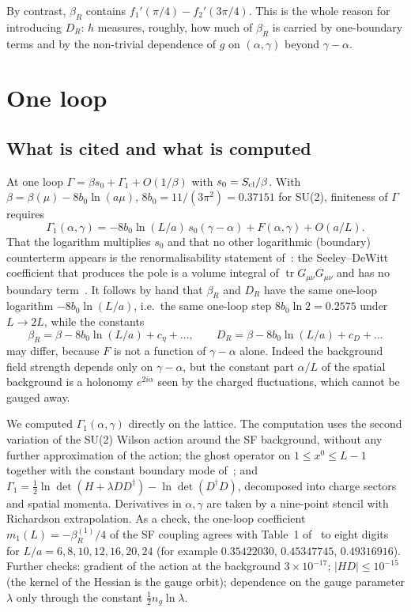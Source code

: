 \documentclass[11pt,a4paper]{article}
\theoremstyle{definition}
\theoremstyle{remark}
\newcommand{\bR}{\beta_R}
\newcommand{\DR}{D_R}
\begin{document}
By contrast, $\bR$ contains $f_1'(\pi/4)-f_2'(3\pi/4)$. This is the whole reason for introducing $\DR$: $h$ measures, roughly, how much of $\bR$ is carried by one-boundary terms and by the non-trivial dependence of $g$ on $(\alpha,\gamma)$ beyond $\gamma-\alpha$.

\section{One loop}\label{sec:oneloop}

\subsection{What is cited and what is computed}

At one loop $\Gamma=\beta s_0+\Gamma_1+O(1/\beta)$ with $s_0=S_{\rm cl}/\beta$. With $\beta=\beta(\mu)-8b_0\ln(a\mu)$, $8b_0=11/(3\pi^2)=0.37151$ for SU(2), finiteness of $\Gamma$ requires
\[
\Gamma_1(\alpha,\gamma)=-8b_0\ln(L/a)\,s_0(\gamma-\alpha)+F(\alpha,\gamma)+O(a/L).
\]
That the logarithm multiplies $s_0$ and that no other logarithmic (boundary) counterterm appears is the renormalisability statement of~\cite{LNWW}: the Seeley--DeWitt coefficient that produces the pole is a volume integral of $\operatorname{tr}G_{\mu\nu}G_{\mu\nu}$ and has no boundary term~\cite[(3.28), (3.36)]{LNWW}. It follows by hand that $\bR$ and $\DR$ have the same one-loop logarithm $-8b_0\ln(L/a)$, i.e.\ the same one-loop step $8b_0\ln2=0.2575$ under $L\to2L$, while the constants
\[
\bR=\beta-8b_0\ln(L/a)+c_\eta+\dots,\qquad \DR=\beta-8b_0\ln(L/a)+c_D+\dots
\]
may differ, because $F$ is not a function of $\gamma-\alpha$ alone. Indeed the background field strength depends only on $\gamma-\alpha$, but the constant part $\alpha/L$ of the spatial background is a holonomy $e^{2i\alpha}$ seen by the charged fluctuations, which cannot be gauged away.

We computed $\Gamma_1(\alpha,\gamma)$ directly on the lattice. The computation uses the second variation of the SU(2) Wilson action around the SF background, without any further approximation of the action; the ghost operator on $1\le x^0\le L-1$ together with the constant boundary mode of~\cite[(6.3)]{LNWW}; and $\Gamma_1=\tfrac12\ln\det(H+\lambda DD^\dagger)-\ln\det(D^\dagger D)$, decomposed into charge sectors and spatial momenta. Derivatives in $\alpha,\gamma$ are taken by a nine-point stencil with Richardson extrapolation. As a check, the one-loop coefficient $m_1(L)=-\bR^{(1)}/4$ of the SF coupling agrees with Table~1 of~\cite{LNWW} to eight digits for $L/a=6,8,10,12,16,20,24$ (for example $0.35422030$, $0.45347745$, $0.49316916$). Further checks: gradient of the action at the background $3\times10^{-17}$; $|HD|\le10^{-15}$ (the kernel of the Hessian is the gauge orbit); dependence on the gauge parameter $\lambda$ only through the constant $\tfrac12 n_g\ln\lambda$.
\end{document}
